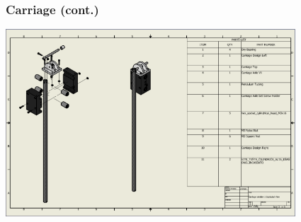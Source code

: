 \documentclass[aspectratio=169]{beamer}
\begin{document}
\begin{frame}
    \frametitle{Carriage (cont.)}

    \includegraphics[height=7cm]{closeup2}
\end{frame}
\end{document}
